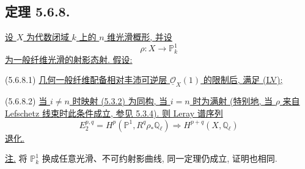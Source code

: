 \subsection*{定理 5.6.8.}
\underline{设 $X$ 为代数闭域 $k$ 上的 $n$ 维光滑概形, 并设}
\[
\rho:X\longrightarrow\mathbb P^1_k
\]
\underline{为一般纤维光滑的射影态射. 假设:}

\smallskip
\noindent
\textup{(5.6.8.1)}\quad
\underline{几何一般纤维配备相对丰沛可逆层 $\underline{\mathcal O}_X(1)$ 的限制后, 满足 (LV);}

\smallskip
\noindent
\textup{(5.6.8.2)}\quad
\underline{当 $i\neq n$ 时映射 (5.3.2) 为同构, 当 $i=n$ 时为满射 (特别地, 当 $\rho$ 来自 Lefschetz 线束时此条件成立, 参见 5.3.4). 则 Leray 谱序列}
\[
E_2^{p,q}=H^p(\mathbb P^1,R^q\rho_*\mathbb Q_\ell)
\Longrightarrow H^{p+q}(X,\mathbb Q_\ell)
\]
\underline{退化.}

\smallskip
\noindent
\underline{注.}
将 $\mathbb P^1_k$ 换成任意光滑、不可约射影曲线, 同一定理仍成立, 证明也相同.

